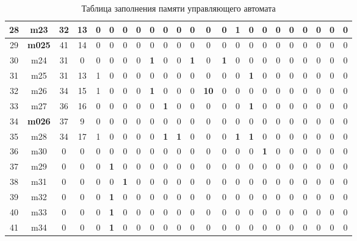 \documentclass[a4paper,14pt]{extarticle}
\begin{document}
\begin{landscape}
\begin{table}[htbp]
\begin{tabular}{|c||c|c|c|c|c|c|c|c|c|c|c|c|c|c|c|c|c|c|c|c|c|c|}
		28 & m23 & 32 & 13 & 0 & 0 & 0 & 0 & 0 & 0 & 0 & 0 & 0 & 0 & \textbf{1} & 0 & 0 & 0 & 0 & 0 & 0 & 0 & 0 \\ \hline
		29 & \textbf{m025} & 41 & 14 & 0 & 0 & 0 & 0 & 0 & 0 & 0 & 0 & 0 & 0 & 0 & 0 & 0 & 0 & 0 & 0 & 0 & 0 & 0 \\ \hline
		30 & m24 & 31 & 0 & 0 & 0 & 0 & 0 & \textbf{1} & 0 & 0 & \textbf{1} & 0 & \textbf{1} & 0 & 0 & 0 & 0 & 0 & 0 & 0 & 0 & 0 \\ \hline
		31 & m25 & 31 & 13 & 1 & 0 & 0 & 0 & 0 & 0 & 0 & 0 & 0 & 0 & 0 & \textbf{1} & 0 & 0 & 0 & 0 & 0 & 0 & 0 \\ \hline
		32 & m26 & 34 & 15 & 1 & 0 & 0 & 0 & \textbf{1} & 0 & 0 & 0 & \textbf{10} & 0 & 0 & 0 & 0 & 0 & 0 & 0 & 0 & 0 & 0 \\ \hline
		33 & m27 & 36 & 16 & 0 & 0 & 0 & 0 & 0 & \textbf{1} & 0 & 0 & 0 & 0 & 0 & \textbf{1} & 0 & 0 & 0 & 0 & 0 & 0 & 0 \\ \hline
		34 & \textbf{m026} & 37 & 9 & 0 & 0 & 0 & 0 & 0 & 0 & 0 & 0 & 0 & 0 & 0 & 0 & 0 & 0 & 0 & 0 & 0 & 0 & 0 \\ \hline
		35 & m28 & 34 & 17 & 1 & 0 & 0 & 0 & 0 & \textbf{1} & \textbf{1} & 0 & 0 & 0 & \textbf{1} & \textbf{1} & 0 & 0 & 0 & 0 & 0 & 0 & 0 \\ \hline
		36 & m30 & 0 & 0 & 0 & 0 & 0 & 0 & 0 & 0 & 0 & 0 & 0 & 0 & 0 & 0 & \textbf{1} & 0 & 0 & 0 & 0 & 0 & 0 \\ \hline
		37 & m29 & 0 & 0 & 0 & \textbf{1} & 0 & 0 & 0 & 0 & 0 & 0 & 0 & 0 & 0 & 0 & 0 & 0 & 0 & 0 & 0 & 0 & 0 \\ \hline
		38 & m31 & 0 & 0 & 0 & 0 & \textbf{1} & 0 & 0 & 0 & 0 & 0 & 0 & 0 & 0 & 0 & 0 & 0 & 0 & 0 & 0 & 0 & 0 \\ \hline
		39 & m32 & 0 & 0 & 0 & \textbf{1} & 0 & 0 & 0 & 0 & 0 & 0 & 0 & 0 & 0 & 0 & 0 & 0 & 0 & 0 & 0 & 0 & 0 \\ \hline
		40 & m33 & 0 & 0 & 0 & \textbf{1} & 0 & 0 & 0 & 0 & 0 & 0 & 0 & 0 & 0 & 0 & 0 & 0 & 0 & 0 & 0 & 0 & 0 \\ \hline
		41 & m34 & 0 & 0 & 0 & \textbf{1} & 0 & 0 & 0 & 0 & 0 & 0 & 0 & 0 & 0 & 0 & 0 & 0 & 0 & 0 & 0 & 0 & 0 \\ \hline
	\end{tabular}
	\caption{Таблица заполнения памяти управляющего автомата}
	\label{tab:coursememory1}
\end{table}
\end{landscape}
\end{document}
